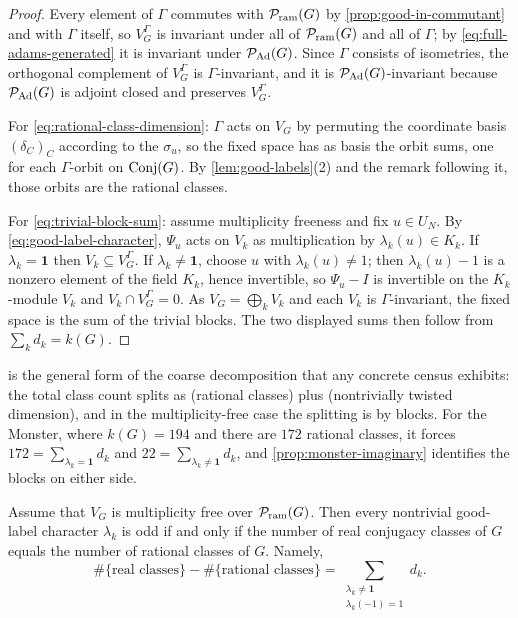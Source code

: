 \begin{proof}
Every element of \(\Gamma\) commutes with \(\mathcal P_{\mathrm{ram}}(G)\) by
\cref{prop:good-in-commutant} and with \(\Gamma\) itself, so
\(V_G^{\Gamma}\) is invariant under all of \(\mathcal P_{\mathrm{ram}}(G)\) and all of
\(\Gamma\); by \eqref{eq:full-adams-generated} it is invariant under
\(\mathcal P_{\mathrm{Ad}}(G)\).  Since \(\Gamma\) consists of isometries, the orthogonal
complement of \(V_G^\Gamma\) is \(\Gamma\)-invariant, and it is
\(\mathcal P_{\mathrm{Ad}}(G)\)-invariant because \(\mathcal P_{\mathrm{Ad}}(G)\) is adjoint closed and preserves
\(V_G^\Gamma\).

For \eqref{eq:rational-class-dimension}: \(\Gamma\) acts on \(V_G\) by
permuting the coordinate basis \((\delta_C)_C\) according to the
\(\sigma_u\), so the fixed space has as basis the orbit sums, one for each
\(\Gamma\)-orbit on \(\operatorname{Conj}(G)\).  By \cref{lem:good-labels}(2) and the
remark following it, those orbits are the rational classes.

For \eqref{eq:trivial-block-sum}: assume multiplicity freeness and fix
\(u\in U_N\).  By \eqref{eq:good-label-character}, \(\Psi_u\) acts on
\(V_k\) as multiplication by \(\lambda_k(u)\in K_k\).  If
\(\lambda_k=\mathbf1\) then \(V_k\subseteq V_G^\Gamma\).  If
\(\lambda_k\neq\mathbf1\), choose \(u\) with \(\lambda_k(u)\neq1\); then
\(\lambda_k(u)-1\) is a nonzero element of the field \(K_k\), hence
invertible, so \(\Psi_u-I\) is invertible on the \(K_k\)-module \(V_k\) and
\(V_k\cap V_G^\Gamma=0\).  As \(V_G=\bigoplus_kV_k\) and each \(V_k\) is
\(\Gamma\)-invariant, the fixed space is the sum of the trivial blocks.  The
two displayed sums then follow from \(\sum_kd_k=k(G)\).
\end{proof}

 is the general form of the coarse
decomposition that any concrete census exhibits: the total class count
splits as (rational classes) plus (nontrivially twisted dimension), and in
the multiplicity-free case the splitting is by blocks.  For the Monster,
where \(k(G)=194\) and there are \(172\) rational classes, it forces
\(172=\sum_{\lambda_k=\mathbf1}d_k\) and
\(22=\sum_{\lambda_k\neq\mathbf1}d_k\), and \cref{prop:monster-imaginary}
identifies the blocks on either side.

\begin{proposition}
\label{prop:real-rational-parity}
Assume that \(V_G\) is multiplicity free over \(\mathcal P_{\mathrm{ram}}(G)\).  Then every
nontrivial good-label character \(\lambda_k\) is odd if and only if the
number of real conjugacy classes of \(G\) equals the number of rational
classes of \(G\).  Namely,
\begin{equation}
 \#\{\text{real classes}\}-\#\{\text{rational classes}\}
 =
 \sum_{\substack{\lambda_k\neq\mathbf1\\ \lambda_k(-1)=1}}d_k .
 \label{eq:real-rational-parity}
\end{equation}
\end{proposition}


